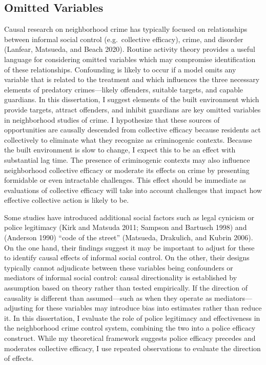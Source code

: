 \documentclass [11pt, proquest] {uwthesis}[2015/03/03]
\begin{document}
\hypertarget{omitted-variables}{%
\subsection{Omitted Variables}\label{omitted-variables}}

Causal research on neighborhood crime has typically focused on relationships between informal social control (e.g.~collective efficacy), crime, and disorder (Lanfear, Matsueda, and Beach 2020). Routine activity theory provides a useful language for considering omitted variables which may compromise identification of these relationships. Confounding is likely to occur if a model omits any variable that is related to the treatment and which influences the three necessary elements of predatory crimes---likely offenders, suitable targets, and capable guardians. In this dissertation, I suggest elements of the built environment which provide targets, attract offenders, and inhibit guardians are key omitted variables in neighborhood studies of crime. I hypothesize that these sources of opportunities are causally descended from collective efficacy because residents act collectively to eliminate what they recognize as criminogenic contexts. Because the built environment is slow to change, I expect this to be an effect with substantial lag time. The presence of criminogenic contexts may also influence neighborhood collective efficacy or moderate its effects on crime by presenting formidable or even intractable challenges. This effect should be immediate as evaluations of collective efficacy will take into account challenges that impact how effective collective action is likely to be.

Some studies have introduced additional social factors such as legal cynicism or police legitimacy (Kirk and Matsuda 2011; Sampson and Bartusch 1998) and (Anderson 1990) ``code of the street'' (Matsueda, Drakulich, and Kubrin 2006). On the one hand, their findings suggest it may be important to adjust for these to identify causal effects of informal social control. On the other, their designs typically cannot adjudicate between these variables being confounders or mediators of informal social control: causal directionality is established by assumption based on theory rather than tested empirically. If the direction of causality is different than assumed---such as when they operate as mediators---adjusting for these variables may introduce bias into estimates rather than reduce it. In this dissertation, I evaluate the role of police legitimacy and effectiveness in the neighborhood crime control system, combining the two into a police efficacy construct. While my theoretical framework suggests police efficacy precedes and moderates collective efficacy, I use repeated observations to evaluate the direction of effects.
\end{document}
